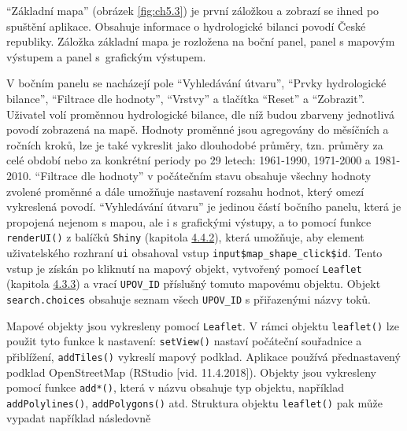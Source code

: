 \documentclass[12pt,]{article}
\newenvironment{Shaded}{\begin{snugshade}}{\end{snugshade}}
\newcommand{\KeywordTok}[1]{\textcolor[rgb]{0.13,0.29,0.53}{\textbf{#1}}}
\newcommand{\DataTypeTok}[1]{\textcolor[rgb]{0.13,0.29,0.53}{#1}}
\newcommand{\StringTok}[1]{\textcolor[rgb]{0.31,0.60,0.02}{#1}}
\newcommand{\OperatorTok}[1]{\textcolor[rgb]{0.81,0.36,0.00}{\textbf{#1}}}
\newcommand{\NormalTok}[1]{#1}
\begin{document}
\qquad \enquote{Základní mapa} (obrázek \ref{fig:ch5.3}) je první
záložkou a zobrazí se ihned po spuštění aplikace. Obsahuje informace o
hydrologické bilanci povodí České republiky. Záložka základní mapa je
rozložena na boční panel, panel s mapovým výstupem a panel s~grafickým
výstupem.

\qquad V bočním panelu se nacházejí pole \enquote{Vyhledávání útvaru},
\enquote{Prvky hydrologické bilance}, \enquote{Filtrace dle hodnoty},
\enquote{Vrstvy} a tlačítka \enquote{Reset} a \enquote{Zobrazit}.
Uživatel volí proměnnou hydrologické bilance, dle níž budou zbarveny
jednotlivá povodí zobrazená na mapě. Hodnoty proměnné jsou agregovány do
měsíčních a ročních kroků, lze je také vykreslit jako dlouhodobé
průměry, tzn. průměry za celé období nebo za konkrétní periody po 29
letech: 1961-1990, 1971-2000 a 1981-2010. \enquote{Filtrace dle hodnoty}
v počátečním stavu obsahuje všechny hodnoty zvolené proměnné a dále
umožňuje nastavení rozsahu hodnot, který omezí vykreslená povodí.
\enquote{Vyhledávání útvaru} je jedinou částí bočního panelu, která je
propojená nejenom s mapou, ale i s grafickými výstupy, a to pomocí
funkce \texttt{renderUI()} z balíčků \texttt{Shiny} (kapitola
\protect\hyperlink{shiny}{4.4.2}), která umožňuje, aby element
uživatelského rozhraní \texttt{ui} obsahoval vstup
\texttt{input\$map\_shape\_click\$id}. Tento vstup je získán po kliknutí
na mapový objekt, vytvořený pomocí \texttt{Leaflet} (kapitola
\protect\hyperlink{leaflet}{4.3.3}) a vrací \texttt{UPOV\_ID} příslušný
tomuto mapovému objektu. Objekt \texttt{search.choices} obsahuje seznam
všech \texttt{UPOV\_ID} s přiřazenými názvy toků.

\begin{Shaded}
\end{Shaded}

\qquad Mapové objekty jsou vykresleny pomocí \texttt{Leaflet}. V rámci
objektu \texttt{leaflet()} lze použit tyto funkce k nastavení:
\texttt{setView()} nastaví počáteční souřadnice a přiblížení,
\texttt{addTiles()} vykreslí mapový podklad. Aplikace používá
přednastavený podklad OpenStreetMap (RStudio {[}vid. 11.4.2018{]}).
Objekty jsou vykresleny pomocí funkce \texttt{add*()}, která v názvu
obsahuje typ objektu, například \texttt{addPolylines()},
\texttt{addPolygons()} atd. Struktura objektu \texttt{leaflet()} pak
může vypadat například následovně
\end{document}
